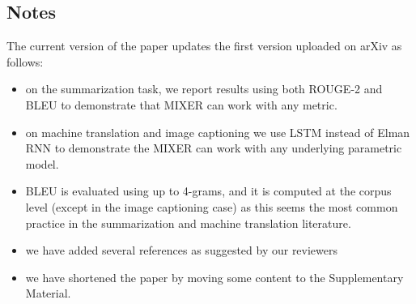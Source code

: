 \subsection{Notes}
The current version of the paper updates the first version uploaded on arXiv as follows:
\begin{itemize}
\item on the summarization task, we report results using both ROUGE-2 and BLEU to demonstrate that MIXER can work with any metric.
\item on machine translation and image captioning we use LSTM instead of Elman RNN to demonstrate the MIXER can work with any underlying parametric model.
\item BLEU is evaluated using up to 4-grams, and it is computed at the corpus level (except in the image captioning case) as this seems the most common practice
in the summarization and machine translation literature.
\item we have added several references as suggested by our reviewers
\item we have shortened the paper by moving some content to the Supplementary Material. 
\end{itemize}